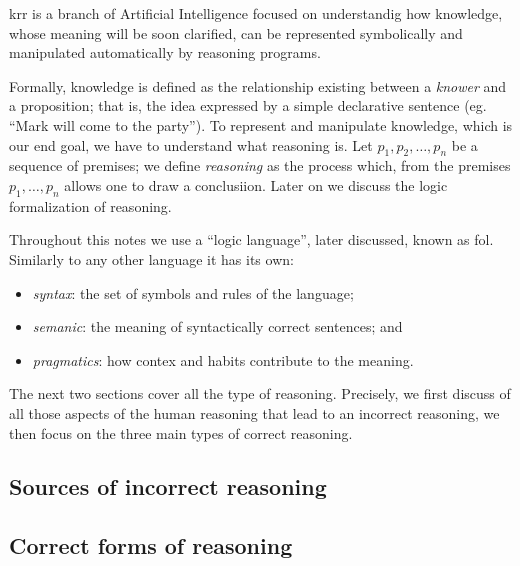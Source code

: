 \documentclass{subfiles}
\begin{document}
    \gls{krr} is a branch of Artificial Intelligence focused on understandig how 
        knowledge, whose meaning will be soon clarified, 
        can be represented symbolically and manipulated automatically by reasoning programs.

    Formally, knowledge is defined as the relationship existing between a \emph{knower} and 
        a proposition; that is, the idea expressed by a simple declarative sentence
        (eg. ``Mark will come to the party'').
        To represent and manipulate knowledge, which is our end goal, we have to understand 
        what reasoning is.
    Let \(p_{1}, p_{2}, \ldots, p_{n}\) be a sequence of premises;
        we define \emph{reasoning} as the process which, from the premises \(p_{1}, \ldots, p_{n}\)
        allows one to draw a conclusiion. Later on we discuss the logic formalization of reasoning.

    Throughout this notes we use a ``logic language'', later discussed, known as \gls{fol}.
        Similarly to any other language it has its own:
        \begin{itemize}
            \item \emph{syntax}: the set of symbols and rules of the language;
            \item \emph{semanic}: the meaning of syntactically correct sentences; and
            \item \emph{pragmatics}: how contex and habits contribute to the meaning.
        \end{itemize}

    The next two sections cover all the type of reasoning. 
        Precisely, we first discuss of all those aspects of the human reasoning that lead to an incorrect reasoning,
        we then focus on the three main types of correct reasoning.

    \subsection{Sources of incorrect reasoning}
    

    \subsection{Correct forms of reasoning}
    
\end{document}
